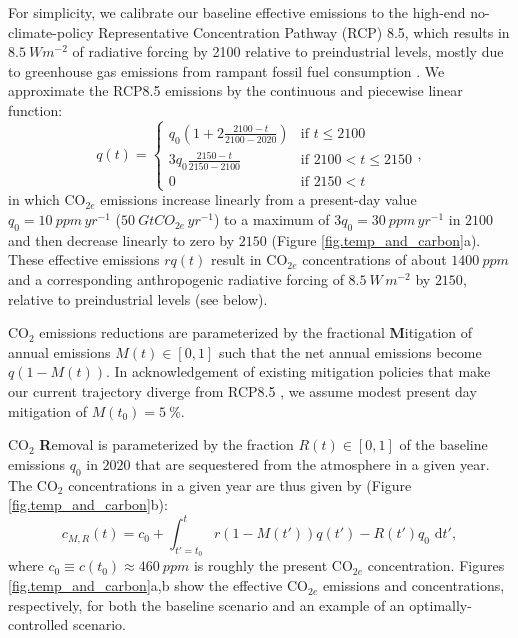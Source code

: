 \documentclass{article}
\begin{document}
For simplicity, we calibrate our baseline effective emissions to the high-end no-climate-policy Representative Concentration Pathway (RCP) 8.5, which results in $\SI{8.5}{W m^{-2}}$ of radiative forcing by 2100 relative to preindustrial levels, mostly due to greenhouse gas emissions from rampant fossil fuel consumption \citep{riahi_scenarios_2007}. We approximate the RCP8.5 emissions by the continuous and piecewise linear function:
\begin{equation}
    q(t) = 
    \begin{cases}
        q_{0}(1 + 2\frac{2100-t}{2100-2020}) &\mbox{if } t \le 2100 \\
        3q_{0}\frac{2150-t}{2150-2100} &\mbox{if } 2100 < t \le 2150 \\
        0 &\mbox{if } 2150 < t
    \end{cases},\label{eq.baseline_emissions}
\end{equation}
in which CO$_{2e}$ emissions increase linearly from a present-day value $q_{0} = \SI{10}{ppm\, yr^{-1}}$ ($\SI{50}{GtCO_{2e}\, yr^{-1}}$) to a maximum of $3q_{0} = \SI{30}{ppm\, yr^{-1}}$ in $2100$ and then decrease linearly to zero by $2150$ (Figure \ref{fig.temp_and_carbon}a). These effective emissions $rq(t)$ result in CO$_{2e}$ concentrations of about $\SI{1400}{ppm}$ and a corresponding anthropogenic radiative forcing of $\SI{8.5}{W\, m^{-2}}$ by $2150$, relative to preindustrial levels (see below).

CO$_{2}$ emissions reductions are parameterized by the fractional \textbf{M}itigation of annual emissions $M(t) \in [0,1]$ such that the net annual emissions become $q(1-M(t))$. In acknowledgement of existing mitigation policies that make our current trajectory diverge from RCP8.5 \citep{hausfather_emissions_2020}, we assume modest present day mitigation of $M(t_{0}) = \SI{5}{\%}$.

CO$_{2}$ \textbf{R}emoval is parameterized by the fraction $R(t) \in [0,1]$ of the baseline emissions $q_{0}$ in $2020$ that are sequestered from the atmosphere in a given year. The CO$_{2}$ concentrations in a given year are thus given by (Figure \ref{fig.temp_and_carbon}b):
\begin{equation}
    c_{M, R}(t) = c_{0} + \int_{t'=t_{0}}^{t} r(1-M(t'))q(t') - R(t')q_{0} \text{ d}t'\label{eq-CO2-conc},
\end{equation}
where $c_{0} \equiv c(t_{0}) \approx \SI{460}{ppm}$ is roughly the present CO$_{2e}$ concentration. Figures \ref{fig.temp_and_carbon}a,b show the effective CO$_{2e}$ emissions and concentrations, respectively, for both the baseline scenario and an example of an optimally-controlled scenario.
\end{document}
